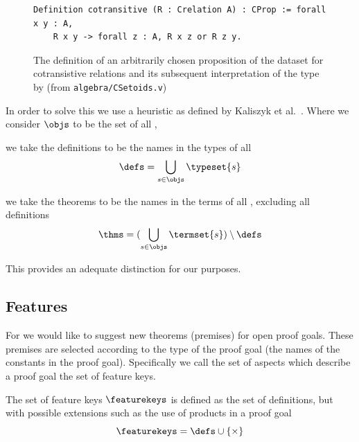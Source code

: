 \begin{figure}[H]
	\begin{lstlisting}[language=Coq, mathescape]
Definition cotransitive (R : Crelation A) : CProp := forall x y : A,
	R x y -> forall z : A, R x z or R z y.
	\end{lstlisting}
	
	
	\caption{The definition of an arbitrarily chosen \cprop proposition of the \corn dataset for cotransistive relations
		and its subsequent interpretation of the type by \coq (from \texttt{algebra/CSetoids.v})}
\end{figure}

In order to solve this we use a heuristic as defined by Kaliszyk et al.\ \cite{kaliszyk2014machine}.
Where we consider $\objs$ to be the set of all \coqobjs,

\begin{definition}\label{def:defs}
  we take the definitions to be the names in the types of all \coqobjs
  \[ \defs = \bigcup_{s \in \objs} \typeset{s} \]
\end{definition}

\begin{definition}\label{def:thms}
  we take the theorems to be the names in the terms of all \coqobj, excluding all definitions
  \[ \thms = (\bigcup_{s \in \objs} \termset{s}) \setminus \defs \]
\end{definition}

This provides an adequate distinction for our purposes.

\subsection{Features}
\label{section:feats}

For \premiseselection we would like to suggest new theorems (premises) for open proof goals.
These premises are selected according to the type of the proof goal (the names of the constants in the proof goal).
Specifically we call the set of aspects which describe a proof goal the set of feature keys.

\begin{definition}\label{def:featurekeys}
  The set of feature keys $\featurekeys$ is defined as the set of definitions, but with possible extensions such as the use of products in a proof goal
  \[ \featurekeys = \defs \cup \{ \times \} \]
\end{definition}

